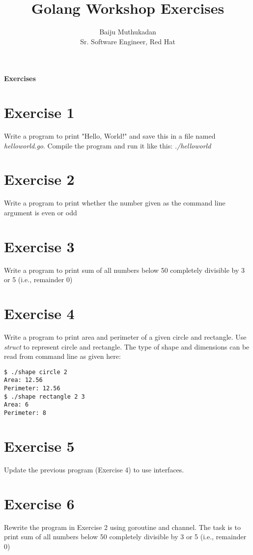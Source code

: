 \documentclass[11pt,a4paper]{article}
\title{\bf{Golang Workshop Exercises}}
\author{Baiju Muthukadan \\ Sr. Software Engineer, Red Hat}
\date{}
\begin{document}
\maketitle

\centerline{\LARGE\bf Exercises}
\section*{Exercise 1}
Write a program to print "Hello, World!" and save this in a
file named {\it helloworld.go}.  Compile the program and run
it like this: {\it./helloworld}

\section*{Exercise 2}
Write a program to print whether the number given as the command line
argument is even or odd

\section*{Exercise 3}
Write a program to print sum of all numbers below 50 completely
divisible by 3 or 5 (i.e., remainder 0)

\section*{Exercise 4}

Write a program to print area and perimeter of a given circle and
rectangle.  Use {\it struct} to represent circle and rectangle.  The
type of shape and dimensions can be read from command line as given
here:

\begin{verbatim}
$ ./shape circle 2
Area: 12.56
Perimeter: 12.56
$ ./shape rectangle 2 3
Area: 6
Perimeter: 8
\end{verbatim}

\section*{Exercise 5}

Update the previous program (Exercise 4) to use interfaces.

\section*{Exercise 6}

Rewrite the program in Exercise 2 using goroutine and channel.  The
task is to print sum of all numbers below 50 completely divisible by 3
or 5 (i.e., remainder 0)
\end{document}
